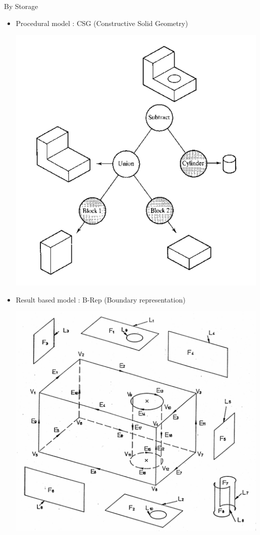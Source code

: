 \begin{frame}[fragile]{By Storage}
\begin{itemize}
\item Procedural model : CSG (Constructive Solid Geometry)

\includegraphics[width=0.4\linewidth,keepaspectratio]{images/CADCSG.png}
\item Result based model : B-Rep (Boundary representation)

\includegraphics[width=0.4\linewidth,keepaspectratio]{images/CADBrep.png}
\end{itemize}
\end{frame}

